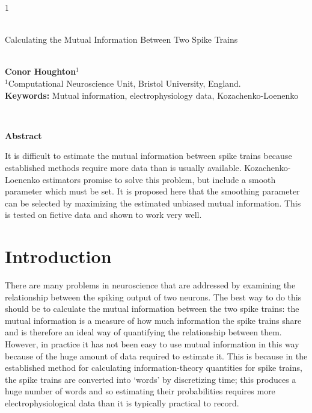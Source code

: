 \documentclass[12pt]{article}
\begin{document}
\hspace{13.9cm}1

\ \vspace{20mm}\\

{\LARGE Calculating the Mutual Information Between Two Spike Trains}

\ \\
{\bf \large Conor Houghton$^{\displaystyle 1}$}\\
{$^{\displaystyle 1}$Computational Neuroscience Unit, Bristol University, England.}\\
%

{\bf Keywords:} Mutual information, electrophysiology data, Kozachenko-Loenenko

\thispagestyle{empty}
%
\ \vspace{-0mm}\\
%
\begin{center} {\bf Abstract} \end{center}
It is difficult to estimate the mutual information between spike
trains because established methods require more data than is usually
available. Kozachenko-Loenenko estimators promise to solve this
problem, but include a smooth parameter which must be set. It is
proposed here that the smoothing parameter can be selected by
maximizing the estimated unbiased mutual information. This is tested
on fictive data and shown to work very well.

\section{Introduction}

There are many problems in neuroscience that are addressed by
examining the relationship between the spiking output of two
neurons. The best way to do this should be to calculate the mutual
information between the two spike trains: the mutual information is a
measure of how much information the spike trains share and is
therefore an ideal way of quantifying the relationship between
them. However, in practice it has not been easy to use mutual
information in this way because of the huge amount of data required to
estimate it. This is because in the established method for calculating
information-theory quantities for spike trains, the spike trains are
converted into \lq{}words\rq{} by discretizing time; this produces a
huge number of words and so estimating their probabilities requires
more electrophysiological data than it is typically practical to
record.
\end{document}
